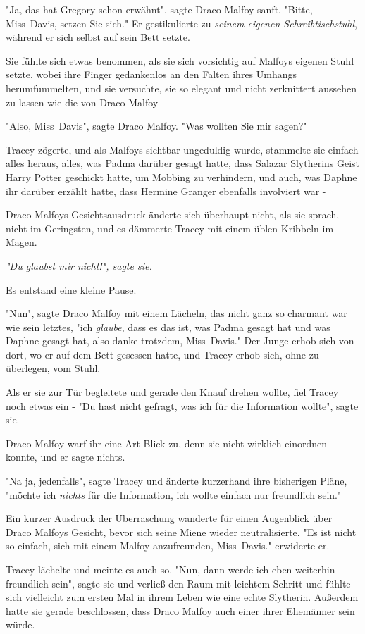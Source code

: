 {"Ja, das hat Gregory schon erwähnt", sagte Draco Malfoy sanft. "Bitte, Miss~Davis, setzen Sie sich." Er gestikulierte zu \emph{seinem eigenen Schreibtischstuhl}, während er sich selbst auf sein Bett setzte.

Sie fühlte sich etwas benommen, als sie sich vorsichtig auf Malfoys eigenen Stuhl setzte, wobei ihre Finger gedankenlos an den Falten ihres Umhangs herumfummelten, und sie versuchte, sie so elegant und nicht zerknittert aussehen zu lassen wie die von Draco Malfoy -

"Also, Miss~Davis", sagte Draco Malfoy. "Was wollten Sie mir sagen?"

Tracey zögerte, und als Malfoys sichtbar ungeduldig wurde, stammelte sie einfach alles heraus, alles, was Padma darüber gesagt hatte, dass Salazar Slytherins Geist Harry Potter geschickt hatte, um Mobbing zu verhindern, und auch, was Daphne ihr darüber erzählt hatte, dass Hermine Granger ebenfalls involviert war -

Draco Malfoys Gesichtsausdruck änderte sich überhaupt nicht, als sie sprach, nicht im Geringsten, und es dämmerte Tracey mit einem üblen Kribbeln im Magen.

\emph{"Du glaubst mir nicht!", sagte sie.}

Es entstand eine kleine Pause.

"Nun", sagte Draco Malfoy mit einem Lächeln, das nicht ganz so charmant war wie sein letztes, "ich \emph{glaube}, dass es das ist, was Padma gesagt hat und was Daphne gesagt hat, also danke trotzdem, Miss~Davis." Der Junge erhob sich von dort, wo er auf dem Bett gesessen hatte, und Tracey erhob sich, ohne zu überlegen, vom Stuhl.

Als er sie zur Tür begleitete und gerade den Knauf drehen wollte, fiel Tracey noch etwas ein - "Du hast nicht gefragt, was ich für die Information wollte", sagte sie.

Draco Malfoy warf ihr eine Art Blick zu, denn sie nicht wirklich einordnen konnte, und er sagte nichts.

"Na ja, jedenfalls", sagte Tracey und änderte kurzerhand ihre bisherigen Pläne, "möchte ich \emph{nichts} für die Information, ich wollte einfach nur freundlich sein."

Ein kurzer Ausdruck der Überraschung wanderte für einen Augenblick über Draco Malfoys Gesicht, bevor sich seine Miene wieder neutralisierte. "Es ist nicht so einfach, sich mit einem Malfoy anzufreunden, Miss~Davis." erwiderte er.

Tracey lächelte und meinte es auch so. "Nun, dann werde ich eben weiterhin freundlich sein", sagte sie und verließ den Raum mit leichtem Schritt und fühlte sich vielleicht zum ersten Mal in ihrem Leben wie eine echte Slytherin. Außerdem hatte sie gerade beschlossen, dass Draco Malfoy auch einer ihrer Ehemänner sein würde.

}
